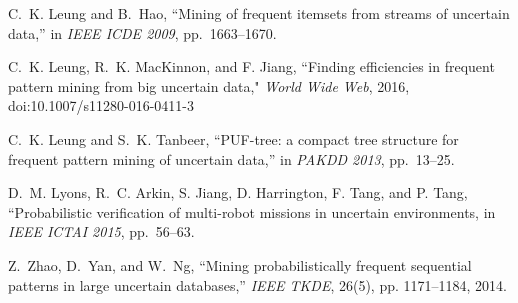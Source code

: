 \documentclass[10pt, conference, compsocconf]{IEEEtran}
\begin{document}
\begin{thebibliography}{10}
C.~K. Leung and B.~Hao, ``Mining of frequent itemsets from streams of uncertain
  data,'' in \emph{IEEE ICDE 2009}, pp.~1663--1670.

 C.~K. Leung, R.~K. MacKinnon, and F. Jiang, ``Finding efficiencies in frequent pattern mining from big uncertain data," {\em World Wide Web}, 2016, doi:10.1007/s11280-016-0411-3

C.~K. Leung and S.~K. Tanbeer, ``PUF-tree: a compact tree structure for
  frequent pattern mining of uncertain data,'' in \emph{PAKDD 2013}, pp.~13--25.

 D.~M. Lyons, R.~C. Arkin, S. Jiang, D. Harrington, F. Tang, and P. Tang, ``Probabilistic verification of multi-robot missions in uncertain environments, in {\em IEEE ICTAI 2015}, pp.~56--63.

Z.~Zhao, D.~Yan, and W.~Ng, ``Mining probabilistically frequent sequential
  patterns in large uncertain databases,'' \emph{{IEEE} TKDE}, 26(5), pp. 1171--1184, 2014.
\end{thebibliography}
\end{document}
